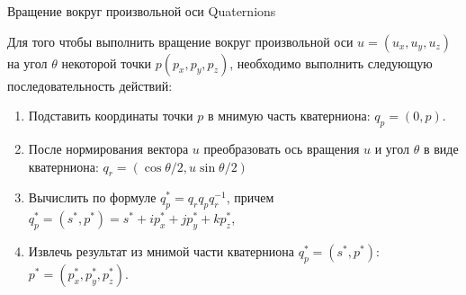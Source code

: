 \documentclass{beamer}
\begin{document}
	\begin{frame}{Вращение вокруг произвольной оси} {Quaternions}
		
		Для того чтобы выполнить вращение вокруг произвольной оси $u=(u_x,u_y,u_z)$ на угол $\theta$ некоторой точки $p(p_x,p_y,p_z)$, необходимо выполнить следующую последовательность действий:

		\begin{enumerate}
			\item Подставить координаты точки $p$ 
			в мнимую часть кватерниона:
			$q_p = (0,p)$.
			
			\item После нормирования вектора $u$ преобразовать ось вращения $u$ и угол $\theta$ в виде кватерниона:
			$q_r = (\cos \theta / 2, u \sin \theta / 2)$
			
			\item Вычислить по формуле $q_p^{*}=q_r q_p q_r^{-1}$, причем 
			$q_p^{*} = (s^{*},p^{*}) = s^*+i p_x^*+jp_y^*+kp_z^*$, 
			
			\item Извлечь результат из мнимой части кватерниона $q_p^{*} = (s^{*},p^{*})$:
			 $p^* = (p_x^*, p_y^*, p_z^*)$.


		\end{enumerate}
		
	\end{frame}
\end{document}
